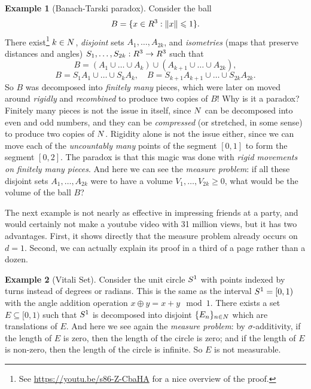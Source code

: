 \documentclass[
]{book}
\let\mathbb\relax %
\newcommand{\N}{\mathbb{N}}
\newcommand{\R}{\mathbb{R}}
\newcommand{\SSS}{\mathbb{S}}
\renewcommand*{\leq}{\leqslant}
\renewcommand*{\geq}{\geqslant}
\theoremstyle{definition}
\theoremstyle{definition}
\newtheorem{example}{Example}[chapter]
\theoremstyle{definition}
\theoremstyle{definition}
\theoremstyle{remark}
\begin{document}
\begin{example}[Banach-Tarski paradox]
\protect\hypertarget{exm:banachtarski}{}\label{exm:banachtarski}Consider the ball \[B = \{x \in \R^3 : \|x\| \leq 1 \} .\] There exist\footnote{See \url{https://youtu.be/s86-Z-CbaHA} for a nice overview of the
  proof.}
\(k\in\N\), \emph{disjoint} sets \(A_1,\dots,A_{2k}\), and \emph{isometries} (maps
that preserve distances and angles) \(S_1,\dots,S_{2k}:\R^3\to\R^3\) such
that
\[B = (A_1 \cup \dots \cup A_k) \cup (A_{k+1} \cup \dots \cup A_{2k}),\]
\[B = S_1 A_1 \cup \dots \cup S_{k} A_{k}, \quad B = S_{k+1} A_{k+1} \cup \dots \cup S_{2k} A_{2k}.\]
So \(B\) was decomposed into \emph{finitely many} pieces, which were later on
moved around \emph{rigidly} and \emph{recombined} to produce two copies of \(B\)!
Why is it a paradox? Finitely many pieces is not the issue in itself,
since \(\N\) can be decomposed into even and odd numbers, and they can be
\emph{compressed} (or stretched, in some sense) to produce two copies of
\(\N\). Rigidity alone is not the issue either, since we can move each of
the \emph{uncountably many} points of the segment \([0,1]\) to form the segment
\([0,2]\). The paradox is that this magic was done with \emph{rigid movements
on finitely many pieces}. And here we can see the \emph{measure problem}: if
all these disjoint sets \(A_1,\dots,A_{2k}\) were to have a volume
\(V_1,\dots,V_{2k} \geq 0\), what would be the volume of the ball \(B\)?
\end{example}

The next example is not nearly as effective in impressing friends at a
party, and would certainly not make a youtube video with 31 million
views, but it has two advantages. First, it shows directly that the
measure problem already occurs on \(d=1\). Second, we can actually explain
its proof in a third of a page rather than a dozen.

\begin{example}[Vitali Set]
\protect\hypertarget{exm:vitali}{}\label{exm:vitali}Consider the unit circle \(\SSS^1\) with points indexed by turns instead of degrees or radians.
This is the same as the interval \(\SSS^1 = [0,1)\) with the angle
addition operation \(x \oplus y = x+y \mod 1\). There exists a set
\(E \subseteq [0,1)\) such that \(\SSS^1\) is decomposed into disjoint
\(\{E_n\}_{n\in\N}\) which are translations of \(E\). And here we see again
the \emph{measure problem}: by \(\sigma\)-additivity, if the length of \(E\) is
zero, then the length of the circle is zero; and if the length of \(E\) is
non-zero, then the length of the circle is infinite. So \(E\) is not
measurable.
\end{example}
\end{document}
